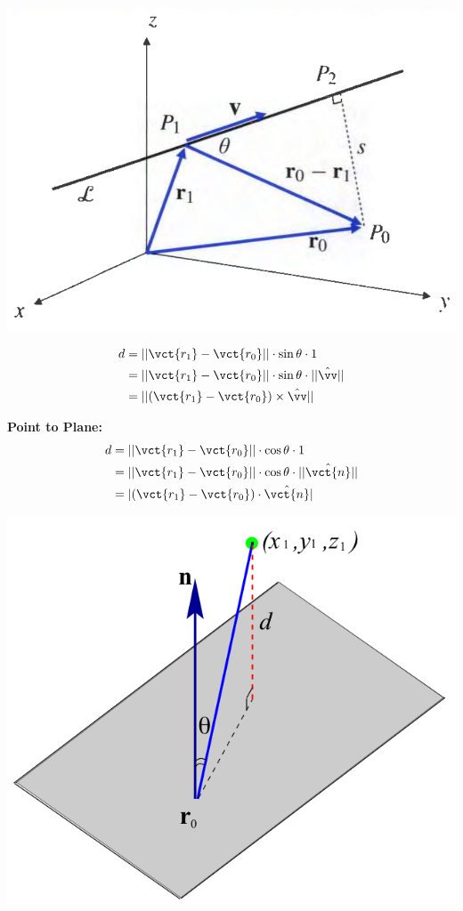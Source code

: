 \begin{spacing}{1.3}
    \begin{center}
        \includegraphics[scale=0.4]{images/Ch10-dist-point-line.png}
    \end{center}
    \begin{align*}
        d &= ||\vct{r_1}-\vct{r_0}||\cdot \sin\theta \cdot 1\\
         &= ||\vct{r_1}-\vct{r_0}||\cdot \sin\theta \cdot ||\hat{\vv}||\\
         &= ||(\vct{r_1}-\vct{r_0})\times \hat{\vv}||
    \end{align*}

    {\bf Point to Plane:} 
    \begin{align*}
        d &= ||\vct{r_1}-\vct{r_0}||\cdot \cos\theta \cdot 1\\
         &= ||\vct{r_1}-\vct{r_0}||\cdot \cos\theta \cdot ||\hat{\vct{n}}||\\
         &= | (\vct{r_1}-\vct{r_0})\cdot \hat{\vct{n}} |
    \end{align*}
    \begin{center}
        \includegraphics[scale=0.3]{images/Ch10-dist-point-plane-2.jpeg}
    \end{center}



\end{spacing}
